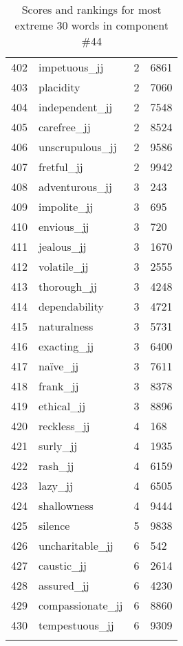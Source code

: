 \begin{longtable}[!htbp]{| rlr@{.}l |}
    402 & impetuous\_jj & 2 & 6861 \\
    403 & placidity & 2 & 7060 \\
    404 & independent\_jj & 2 & 7548 \\
    405 & carefree\_jj & 2 & 8524 \\
    406 & unscrupulous\_jj & 2 & 9586 \\
    407 & fretful\_jj & 2 & 9942 \\
    408 & adventurous\_jj & 3 & 243 \\
    409 & impolite\_jj & 3 & 695 \\
    410 & envious\_jj & 3 & 720 \\
    411 & jealous\_jj & 3 & 1670 \\
    412 & volatile\_jj & 3 & 2555 \\
    413 & thorough\_jj & 3 & 4248 \\
    414 & dependability & 3 & 4721 \\
    415 & naturalness & 3 & 5731 \\
    416 & exacting\_jj & 3 & 6400 \\
    417 & naïve\_jj & 3 & 7611 \\
    418 & frank\_jj & 3 & 8378 \\
    419 & ethical\_jj & 3 & 8896 \\
    420 & reckless\_jj & 4 & 168 \\
    421 & surly\_jj & 4 & 1935 \\
    422 & rash\_jj & 4 & 6159 \\
    423 & lazy\_jj & 4 & 6505 \\
    424 & shallowness & 4 & 9444 \\
    425 & silence & 5 & 9838 \\
    426 & uncharitable\_jj & 6 & 542 \\
    427 & caustic\_jj & 6 & 2614 \\
    428 & assured\_jj & 6 & 4230 \\
    429 & compassionate\_jj & 6 & 8860 \\
    430 & tempestuous\_jj & 6 & 9309 \\
    \hline
    \caption{Scores and rankings for most extreme 30 words in component \#44} \\
\end{longtable}
